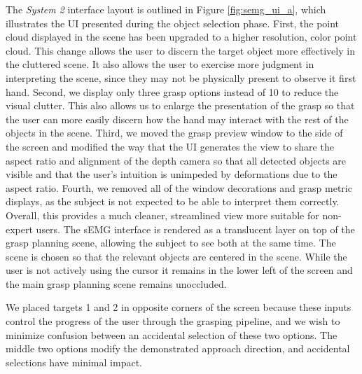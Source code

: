 The \emph{System 2} interface layout is outlined in Figure \ref{fig:semg_ui_a}, which illustrates the UI presented during the object selection phase. First, the point cloud displayed in the scene has been upgraded to a higher resolution, color point cloud. This change allows the user to discern the target object more effectively in the cluttered scene. It also allows the user to exercise more judgment in interpreting the scene, since they may not be physically present to observe it first hand. Second, we display only three grasp options instead of 10 to reduce the visual clutter. This also allows us to enlarge the presentation of the grasp so that the user can more easily discern how the hand may interact with the rest of the objects in the scene. Third, we moved the grasp preview window to the side of the screen and modified the way that the UI generates the view to share the aspect ratio and alignment of the depth camera so that all detected objects are visible and that the user's intuition is unimpeded by deformations due to the aspect ratio. Fourth, we removed all of the window decorations and grasp metric displays, as the subject is not expected to be able to interpret them correctly. Overall, this provides a much cleaner, streamlined view more suitable for non-expert users.  The sEMG interface is rendered as a translucent layer on top of the grasp planning scene, allowing the subject to see both at the same time. The scene is chosen so that the relevant objects are centered in the scene. While the user is not actively using the cursor it remains in the lower left of the screen and the main grasp planning scene remains unoccluded. 

We placed targets 1 and 2 in opposite corners of the screen because these inputs control the progress of the user through the grasping pipeline, and we wish to minimize confusion between an accidental selection of these two options. The middle two options modify the demonstrated approach direction, and accidental selections have minimal impact. 


